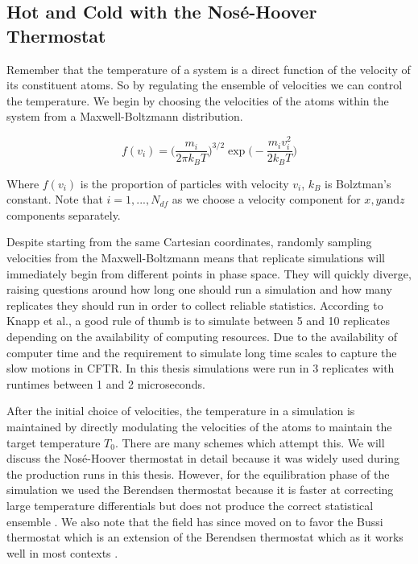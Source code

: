
\subsection{Hot and Cold with the Nos\'e-Hoover Thermostat}
Remember that the temperature of a system is a direct function of the velocity of its constituent atoms. So by regulating the ensemble of velocities we can control the temperature. We begin by choosing the velocities of the atoms within the system from a Maxwell-Boltzmann distribution. 

\begin{equation}
	f(v_i) = \Big(\frac{m_i}{2\pi k_B T}\Big)^{3/2} \exp{\Big(-\frac{m_iv_i^2}{2k_BT}\Big)}
\end{equation}

Where $f(v_i)$ is the proportion of particles with velocity $v_i$, $k_B$ is Bolztman's constant. Note that $i=1,...,N_{df}$ as we choose a velocity component for $x,y \text{and} z$ components separately. 

Despite starting from the same Cartesian coordinates, randomly sampling velocities from the Maxwell-Boltzmann means that replicate simulations will immediately begin from different points in phase space. They will quickly diverge, raising questions around how long one should run a simulation and how many replicates they should run in order to collect reliable statistics. According to Knapp et al.\cite{knapp2018}, a good rule of thumb is to simulate between 5 and 10 replicates depending on the availability of computing resources. Due to the availability of computer time and the requirement to simulate long time scales to capture the slow motions in CFTR. In this thesis simulations were run in 3 replicates with runtimes between 1 and 2 microseconds. 

After the initial choice of velocities, the temperature in a simulation is maintained by directly modulating the velocities of the atoms to maintain the target temperature $T_0$. There are many schemes which attempt this. We will discuss the Nos\'e-Hoover thermostat in detail because it was widely used during the production runs in this thesis. However, for the equilibration phase of the simulation we used the Berendsen thermostat because it is faster at correcting large temperature differentials but does not produce the correct statistical ensemble \cite{bussi2007}. We also note that the field has since moved on to favor the Bussi thermostat which is an extension of the Berendsen thermostat which as it works well in most contexts \cite{bussi2007}\cite{braun2019}.

